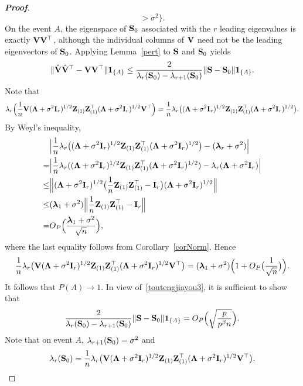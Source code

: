 \documentclass[times,sort&compress,3p]{elsarticle}
\newcommand{\bZ}{\mathbf{Z}}
\newcommand{\bfsym}[1]{\ensuremath{\boldsymbol{#1}}}
\def\blambda {\bfsym {\lambda}}        \def\bLambda {\bfsym {\Lambda}}
\theoremstyle{plain}
\theoremstyle{definition}
\theoremstyle{remark}
\begin{document}
\begin{appendices}
\begin{proof}[\textbf{Proof}]
$$        >\sigma^2
        \Big\}.
        $$
        On the event $A$, the eigenspace of $\mathbf{S}_0$ associated with the $r$ leading eigenvalues is exactly $\mathbf{V} \mathbf{V}^\top$, although the individual columns of $\mathbf{V}$ need not be the leading eigenvectors of $\mathbf{S}_0$.
    Applying Lemma~\ref{pert} to $\mathbf{S}$ and $\mathbf{S}_0$ yields
    \begin{equation}\label{toutengjiayou3}
    \|\hat{\mathbf{V}}\hat{\mathbf{V}}^\top - \mathbf{V}\mathbf{V} ^\top\| \mathbf{1}_{\{A\}}\leq
        \frac{2}{\lambda_r(\mathbf{S}_0)-\lambda_{r+1}(\mathbf{S}_0)}\|\mathbf{S}-\mathbf{S}_0\|\mathbf{1}_{\{A\}}.
    \end{equation}
    Note that
$$
        \lambda_r\Big(\frac{1}{n}\BV(\bLambda+\sigma^2\BI_r)^{1/2}\bZ_{(1)} \bZ_{(1)}^\top(\bLambda+\sigma^2\BI_r)^{1/2}\BV^\top\Big)
    =
        \frac{1}{n}\lambda_r\big((\bLambda+\sigma^2\BI_r)^{1/2}\bZ_{(1)} \bZ_{(1)}^\top(\bLambda+\sigma^2\BI_r)^{1/2}\big).
$$
By Weyl's inequality,
$$
    \begin{aligned}
        &\Big|
        \frac{1}{n}\lambda_r\big((\bLambda+\sigma^2 \BI_r)^{1/2}\bZ_{(1)} \bZ_{(1)}^\top(\bLambda+\sigma^2 \BI_r)^{1/2}\big)
    -
        (\blambda_r+\sigma^2)
    \Big|\\
        =&\Big|
    \frac{1}{n}\lambda_r((\bLambda+\sigma^2 \BI_r)^{1/2}\bZ_{(1)} \bZ_{(1)}^\top(\bLambda+\sigma^2 \BI_r)^{1/2})
    -
    \lambda_r(\bLambda+\sigma^2\BI_r)
    \Big|
        \\
        \leq&
        \Big\|(\bLambda+\sigma^2\BI_r)^{1/2}\big(\frac{1}{n}\bZ_{(1)} \bZ_{(1)}^\top-\BI_r\big)(\bLambda+\sigma^2\BI_r)^{1/2}\Big\|\\
        \leq& (\blambda_1+\sigma^2)\Big\|\frac{1}{n}\bZ_{(1)} \bZ_{(1)}^\top-\BI_r\Big\|
        \\
        =& O_P\Big(\frac{\blambda_1+\sigma^2}{\sqrt{n}}\Big),
    \end{aligned}
$$
    where the last equality follows from Corollary~\ref{corNorm}.
    Hence
$$
        \frac{1}{n}\lambda_r\big(\BV(\bLambda+\sigma^2 \BI_r)^{1/2}\bZ_{(1)} \bZ_{(1)}^\top(\bLambda+\sigma^2 \BI_r)^{1/2}\BV^\top\big)
        =(\blambda_1+\sigma^2)\Big(1+O_P\big(\frac{1}{\sqrt{n}}\big)\Big).
        $$
        It follows that $P(A)\to 1$.
        In view of~\eqref{toutengjiayou3}, it is sufficient to show that
        $$
        \frac{2}{\lambda_r(\mathbf{S}_0)-\lambda_{r+1}(\mathbf{S}_0)}\|\mathbf{S}-\mathbf{S}_0\|\mathbf{1}_{\{A\}}=O_P\Big(\sqrt{\frac{p}{p^{\beta}n }}\Big).
        $$
        Note that on event $A$, $\lambda_{r+1}(\mathbf{S}_0)=\sigma^2$ and
        $$\lambda_r(\BS_0)=\frac{1}{n}\lambda_r\big(\BV(\bLambda+\sigma^2 \BI_r)^{1/2}\bZ_{(1)} \bZ_{(1)}^\top (\bLambda+\sigma^2 \BI_r)^{1/2}\BV^\top \big).$$

\end{proof}
\end{appendices}
\end{document}
